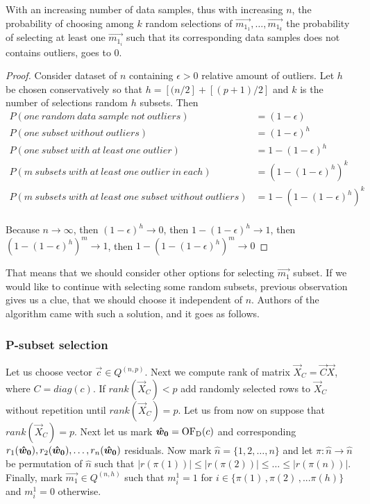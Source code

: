 \begin{observation} \label{hrandomsamples}
    With an increasing number of data samples, thus with increasing $n$, the probability of choosing among $k$ random selections of $\vec{m_{1_1}}, \ldots ,\vec{m_{1_k}}$ the probability of selecting at least one $\vec{m_{1_i}}$ such that its corresponding data samples does not contains outliers, goes to $0$.
\end{observation}

\begin{proof}
    Consider dataset of $n$ containing $\epsilon > 0$ relative amount of outliers. Let $h$ be chosen conservatively so that $h = [(n/2] + [(p+1)/2]$ and $k$ is the number of selections random $h$ subsets. Then
    \begin{align*}
        P(one~random~data~sample~not~outliers) &= (1-\epsilon) \\
        P(one~subset~without~outliers) &= (1-\epsilon)^h \\
        P(one~subset~with~at~least~one~outlier) &= 1-(1-\epsilon)^h \\
        P(m~subsets~with~at~least~one~outlier~in~each) &= (1-(1-\epsilon)^h)^k \\
        P(m~subsets~with~at~least~one~subset~without~outliers) &= 1-(1-(1-\epsilon)^h)^k \\
    \end{align*}

    Because
$n \rightarrow \infty$, then    
$ (1-\epsilon)^h  \rightarrow 0 $, then   
$ 1- (1-\epsilon)^h  \rightarrow 1$, then
$ (1-(1-\epsilon)^h)^m  \rightarrow 1$, then 
$1- (1-(1-\epsilon)^h)^m  \rightarrow 0 $
\end{proof}

That means that we should consider other options for selecting $\vec{m_1}$ subset. If we would like to continue with selecting some random subsets, previous observation gives us a clue, that we should choose it independent of $n$. Authors of the algorithm came with such a solution, and it goes as follows.



\subsubsection*{P-subset selection} \label{section:random:p:samples}

Let us choose vector $\vec{c} \in Q^{(n, p)}$. 
Next we compute rank of matrix $\vec{X}_{C} = \vec{C}\vec{X}$, where $C = diag(c)$. If $rank(\vec{X}_{C}) < p$ add randomly selected rows to $\vec{X}_{C}$ without repetition until $rank(\vec{X}_{C}) = p$. Let us from now on suppose that $rank(\vec{X}_{C}) = p$. Next let us mark $\boldsymbol{\hat{w}_0} = \operatorname{OF_D}(c)$ and corresponding $r_1(\boldsymbol{\hat{w}_0}), r_2(\boldsymbol{\hat{w}_0}), \ldots ,r_n(\boldsymbol{\hat{w}_0})$ residuals.  Now mark $\hat{n} = \{{1,2,\ldots,n\}}$ and let
$\pi: \hat{n} \rightarrow \hat{n}$ be permutation of $\hat{n}$ such that $|r({\pi(1)})| \leq |r({\pi(2)})| \leq \ldots \leq |r({\pi(n)})|$. 
 Finally, mark $\vec{m_1} \in Q^{(n,h)}$  such that $m^1_i = 1$ for $i \in \{{\pi(1)\,, \pi(2)\,,... \pi(h)\}}$ and  $m^1_i = 0$  otherwise.

